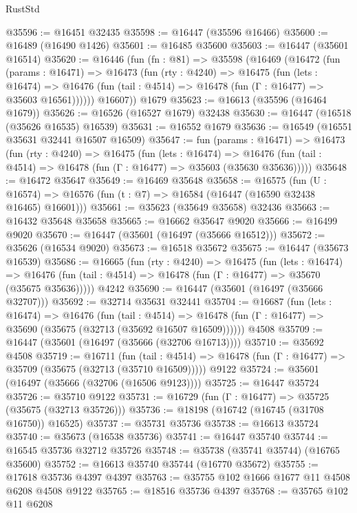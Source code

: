 \begin{lexlean}{RustStd}
\begin{coremodule}
{\begin{coremodule}
{{{{{{{{{{{{{{{{{{{{{{{{{{{{{{{{{{{{{{{{{{{{{{{{{{{{{{{@35596 := @16451 @32435
@35598 := @16447 (@35596 @16466)
@35600 := @16489 (@16490 @1426)
@35601 := @16485 @35600
@35603 := @16447 (@35601 @16514)
@35620 := @16446
    (fun (fn : @81) =>
    @35598
      (@16469
        (@16472
          (fun (params : @16471) =>
          @16473
            (fun (rty : @4240) =>
            @16475
              (fun (lets : @16474) =>
              @16476 (fun (tail : @4514) => @16478 (fun (Γ : @16477) => @35603 @16561))))))
        @16607))
    @1679
@35623 := @16613 (@35596 (@16464 @1679))
@35626 := @16526 (@16527 @1679) @32438
@35630 := @16447 (@16518 (@35626 @16535) @16539)
@35631 := @16552 @1679
@35636 := @16549 (@16551 @35631 @32441 @16507 @16509)
@35647 := fun (params : @16471) =>
  @16473
    (fun (rty : @4240) =>
    @16475
      (fun (lets : @16474) =>
      @16476 (fun (tail : @4514) => @16478 (fun (Γ : @16477) => @35603 (@35630 @35636)))))
@35648 := @16472 @35647
@35649 := @16469 @35648
@35658 := @16575
    (fun (U : @16574) => @16576 (fun (t : @7) => @16584 (@16447 (@16590 @32438 @16465) @16601)))
@35661 := @35623 (@35649 @35658) @32436
@35663 := @16432 @35648 @35658
@35665 := @16662 @35647 @9020
@35666 := @16499 @9020
@35670 := @16447 (@35601 (@16497 (@35666 @16512)))
@35672 := @35626 (@16534 @9020)
@35673 := @16518 @35672
@35675 := @16447 (@35673 @16539)
@35686 := @16665
    (fun (rty : @4240) =>
    @16475
      (fun (lets : @16474) =>
      @16476 (fun (tail : @4514) => @16478 (fun (Γ : @16477) => @35670 (@35675 @35636)))))
    @4242
@35690 := @16447 (@35601 (@16497 (@35666 @32707)))
@35692 := @32714 @35631 @32441
@35704 := @16687
    (fun (lets : @16474) =>
    @16476
      (fun (tail : @4514) =>
      @16478 (fun (Γ : @16477) => @35690 (@35675 (@32713 (@35692 @16507 @16509))))))
    @4508
@35709 := @16447 (@35601 (@16497 (@35666 (@32706 @16713))))
@35710 := @35692 @4508
@35719 := @16711
    (fun (tail : @4514) => @16478 (fun (Γ : @16477) => @35709 (@35675 (@32713 (@35710 @16509)))))
    @9122
@35724 := @35601 (@16497 (@35666 (@32706 (@16506 @9123))))
@35725 := @16447 @35724
@35726 := @35710 @9122
@35731 := @16729 (fun (Γ : @16477) => @35725 (@35675 (@32713 @35726)))
@35736 := @18198 (@16742 (@16745 (@31708 @16750)) @16525)
@35737 := @35731 @35736
@35738 := @16613 @35724
@35740 := @35673 (@16538 @35736)
@35741 := @16447 @35740
@35744 := @16545 @35736 @32712 @35726
@35748 := @35738 (@35741 @35744) (@16765 @35600)
@35752 := @16613 @35740 @35744 (@16770 @35672)
@35755 := @17618 @35736 @4397 @4397
@35763 := @35755 @102 @1666 @1677 @11 @4508 @6208 @4508 @9122
@35765 := @18516 @35736 @4397
@35768 := @35765 @102 @11 @6208
}}}}}}}}}}}}}}}}}}}}}}}}}}}}}}}}}}}}}}}}}}}}}}}}}}}}}}}
\end{coremodule}}
\end{coremodule}
\end{lexlean}
